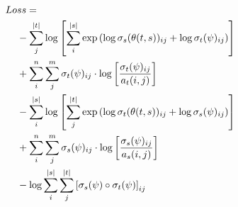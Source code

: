 \documentclass[twoside,twocolumn]{article}
\newlength\mystoreparindent
\newenvironment{myparindent}[1]{%
  \setlength{\mystoreparindent}{\the\parindent}
  \setlength{\parindent}{#1}
  }{%
  \setlength{\parindent}{\mystoreparindent}
}
\begin{document}
\begin{myparindent}{0pt}
\begin{equation}
  \centering
\begin{split}
  Lo&ss = \\
  &- \sum_j^{|t|} \log \left[
      \sum_i^{|s|} \exp \left(
        \log \sigma_s(\theta(t, s))_{ij} + \log \sigma_t(\psi)_{ij} \right)
    \right] \\
  &+ \sum_i^n \sum_j^m \sigma_t(\psi)_{ij} \cdot \log \left[
    \frac{\sigma_t(\psi)_{ij}}{a_t(i, j)} \right] \\
  &- \sum_i^{|s|} \log \left[ \sum_j^{|t|}
      \exp \left(
        \log \sigma_t(\theta(t, s))_{ij} + \log \sigma_s(\psi)_{ij}
      \right)
    \right] \\
  &+ \sum_i^n \sum_j^m \sigma_s(\psi)_{ij} \cdot \log \left[
    \frac{\sigma_s(\psi)_{ij}}{a_s(i, j)} \right] \\
  &- \log \sum_i^{|s|} \sum_j^{|t|} \left[
    \sigma_s(\psi) \circ \sigma_t(\psi) \right]_{ij} \\
\end{split}
\end{equation}

\end{myparindent}
\end{document}

